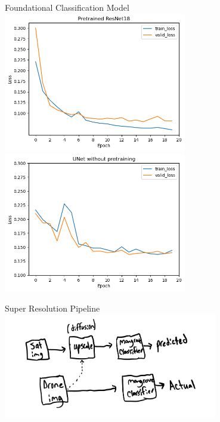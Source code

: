 
\begin{frame}{Foundational Classification Model}
    \centering
    \includegraphics[height=0.6\textheight,width=0.6\textwidth,keepaspectratio]{images/pretrained.png}
    \includegraphics[height=0.6\textheight,width=0.6\textwidth,keepaspectratio]{images/untrained.png}
\end{frame}

\begin{frame}{Super Resolution Pipeline}
    \centering
    \includegraphics[height=0.7\textheight,width=0.7\textwidth,keepaspectratio]{images/superres.jpeg}
\end{frame}


